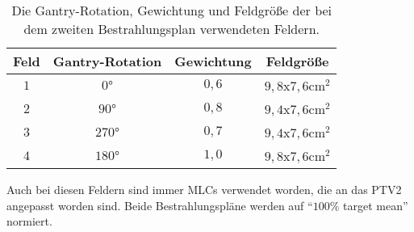 \begin{table}
  \centering
  \caption{Die Gantry-Rotation, Gewichtung und Feldgröße der bei dem zweiten Bestrahlungsplan verwendeten Feldern.}
  \label{tab:Felder2}
  \begin{tabular}{c c c c}
    \toprule
    Feld & Gantry-Rotation & Gewichtung & Feldgröße\\
    \midrule
    $1$ & $0°$   & $0,6$ & $9,8$x$7,6 \si{\centi\meter\squared}$ \\
    $2$ & $90°$  & $0,8$ & $9,4$x$7,6 \si{\centi\meter\squared}$ \\
    $3$ & $270°$ & $0,7$ & $9,4$x$7,6 \si{\centi\meter\squared}$ \\
    $4$ & $180°$ & $1,0$ & $9,8$x$7,6 \si{\centi\meter\squared}$ \\
    \bottomrule
  \end{tabular}
\end{table}

Auch bei diesen Feldern sind immer MLCs verwendet worden, die an das PTV2 angepasst worden sind.
Beide Bestrahlungspläne werden auf \enquote{$100\%$ target mean} normiert.
